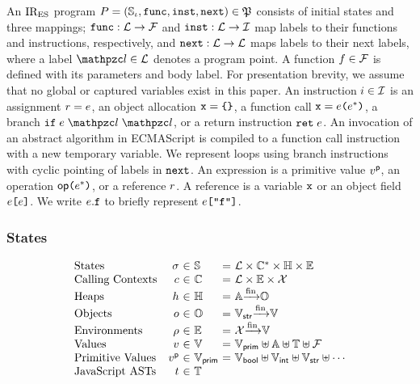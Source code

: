 An $\text{IR}_\text{ES}$ program $P = (\mathbb{S}_\iota, \texttt{func}, \texttt{inst}, \texttt{next}) \in \mathfrak{P} $
consists of initial states and three mappings; $\texttt{func}: \mathcal{L} \rightarrow
\mathcal{F}$ and $\texttt{inst}: \mathcal{L} \rightarrow \mathcal{I}$ map labels to their
functions and instructions, respectively, and $\texttt{next}: \mathcal{L} \rightarrow
\mathcal{L}$ maps labels to their next labels, where a label $\lab \in \labset$
denotes a program point.  A function $f \in \mathcal{F}$ is defined with its
parameters and body label.  For presentation brevity, we assume that no global
or captured variables exist in this paper.  An instruction $i \in \mathcal{I}$
is an assignment $r = e$, an object allocation $\texttt{x} = \texttt{\{} \texttt{\}}$, a
function call $\texttt{x} = e \texttt{(} e^* \texttt{)}$, a branch $\kwif \; \expr \;
\lab \; \lab$, or a return instruction $\texttt{ret} \; e$.  An invocation of an
abstract algorithm in ECMAScript is compiled to a function call instruction with
a new temporary variable.  We represent loops using branch instructions with
cyclic pointing of labels in $\texttt{next}$.  An expression is a primitive value
$v^{\textsf{p}}$, an operation $\textsf{op} \texttt{(} e^* \texttt{)}$, or a reference $r$.  A
reference is a variable $\texttt{x}$ or an object field $e \texttt{[} e \texttt{]}$.
We write $e.\texttt{f}$ to briefly represent $e \texttt{[} \texttt{"f"} \texttt{]}$.


\subsubsection{States}

\[
  \begin{array}{lr@{~}c@{~}l@{~}c@{~}l}
    \text{States} & \st &\in& \stset &=&
    \labset \times \ctxtset^* \times \heapset \times \envset\\

    \text{Calling Contexts} & \ctxt &\in& \ctxtset &=&
    \labset \times \envset \times \varset\\

    \text{Heaps} & \heap &\in& \heapset &=&
    \addrset \finmap \objset\\

    \text{Objects} & \obj &\in& \objset &=&
    \strset \finmap \valset\\

    \text{Environments} & \env &\in& \envset &=&
    \varset \finmap \valset\\

    \text{Values} & \val &\in& \valset &=&
    \pvalset \uplus \addrset \uplus \treeset \uplus \funcset\\

    \text{Primitive Values} & \pval &\in& \pvalset &=&
    \boolset \uplus \intset \uplus \strset \uplus \cdots\\

    \text{JavaScript ASTs} & \tree &\in& \treeset\\
  \end{array}
\]

